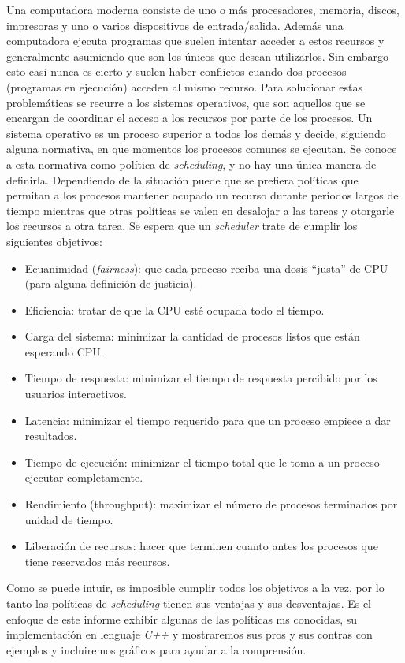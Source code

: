 Una computadora moderna consiste de uno o m\'as procesadores, memoria, discos, impresoras y uno o varios dispositivos de entrada/salida. Adem\'as una computadora ejecuta programas que suelen intentar acceder a estos recursos y generalmente asumiendo que son los \'unicos que desean utilizarlos. Sin embargo esto casi nunca es cierto y suelen haber conflictos cuando dos procesos (programas en ejecuci\'on) acceden al mismo recurso. Para solucionar estas problem\'aticas se recurre a los sistemas operativos, que son aquellos que se encargan de coordinar el acceso a los recursos por parte de los procesos. Un sistema operativo es un proceso superior a todos los dem\'as y decide, siguiendo alguna normativa, en que momentos los procesos comunes se ejecutan. Se conoce a esta normativa como pol\'itica de \emph{scheduling}, y no hay una \'unica manera de definirla. Dependiendo de la situaci\'on puede que se prefiera pol\'iticas que permitan a los procesos mantener ocupado un recurso durante per\'iodos largos de tiempo 
mientras que otras pol\'iticas se valen en desalojar a las tareas y otorgarle los recursos a otra tarea. Se espera que un \emph{scheduler} trate de cumplir los siguientes objetivos:

\begin{itemize}
	\item Ecuanimidad (\emph{fairness}): que cada proceso reciba una dosis “justa” de CPU (para alguna definici\'on de justicia).
	\item Eficiencia: tratar de que la CPU est\'e ocupada todo el tiempo.
	\item Carga del sistema: minimizar la cantidad de procesos listos que est\'an esperando CPU.
	\item Tiempo de respuesta: minimizar el tiempo de respuesta percibido por los usuarios interactivos.
	\item Latencia: minimizar el tiempo requerido para que un proceso empiece a dar resultados.
	\item Tiempo de ejecuci\'on: minimizar el tiempo total que le toma a un proceso ejecutar completamente.
	\item Rendimiento (throughput): maximizar el n\'umero de procesos terminados por unidad de tiempo.
	\item Liberaci\'on de recursos: hacer que terminen cuanto antes los procesos que tiene reservados m\'as recursos.
\end{itemize}

Como se puede intuir, es imposible cumplir todos los objetivos a la vez, por lo tanto las pol\'iticas de \emph{scheduling} tienen sus ventajas y sus desventajas. Es el enfoque de este informe exhibir algunas de las pol\'iticas ms conocidas, su implementaci\'on en lenguaje \emph{C++} y mostraremos sus pros y sus contras con ejemplos y incluiremos gr\'aficos para ayudar a la comprensi\'on.


